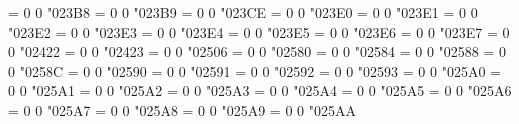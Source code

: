 \Umathchardef\lvboxline = 0 0 "023B8 %
\Umathchardef\rvboxline = 0 0 "023B9 %
\Umathchardef\varcarriagereturn = 0 0 "023CE %
\Umathchardef\obrbrak = 0 0 "023E0 %
\Umathchardef\ubrbrak = 0 0 "023E1 %
\Umathchardef\trapezium = 0 0 "023E2 %
\Umathchardef\benzenr = 0 0 "023E3 %
\Umathchardef\strns = 0 0 "023E4 %
\Umathchardef\fltns = 0 0 "023E5 %
\Umathchardef\accurrent = 0 0 "023E6 %
\Umathchardef\elinters = 0 0 "023E7 %
\Umathchardef\blanksymbol = 0 0 "02422 %
\Umathchardef\mathvisiblespace = 0 0 "02423 %
\Umathchardef\bdtriplevdash = 0 0 "02506 %
\Umathchardef\blockuphalf = 0 0 "02580 %
\Umathchardef\blocklowhalf = 0 0 "02584 %
\Umathchardef\blockfull = 0 0 "02588 %
\Umathchardef\blocklefthalf = 0 0 "0258C %
\Umathchardef\blockrighthalf = 0 0 "02590 %
\Umathchardef\blockqtrshaded = 0 0 "02591 %
\Umathchardef\blockhalfshaded = 0 0 "02592 %
\Umathchardef\blockthreeqtrshaded = 0 0 "02593 %
\Umathchardef\mdlgblksquare = 0 0 "025A0 %
\Umathchardef\mdlgwhtsquare = 0 0 "025A1 %
\Umathchardef\squoval = 0 0 "025A2 %
\Umathchardef\blackinwhitesquare = 0 0 "025A3 %
\Umathchardef\squarehfill = 0 0 "025A4 %
\Umathchardef\squarevfill = 0 0 "025A5 %
\Umathchardef\squarehvfill = 0 0 "025A6 %
\Umathchardef\squarenwsefill = 0 0 "025A7 %
\Umathchardef\squareneswfill = 0 0 "025A8 %
\Umathchardef\squarecrossfill = 0 0 "025A9 %
\Umathchardef\smblksquare = 0 0 "025AA %
